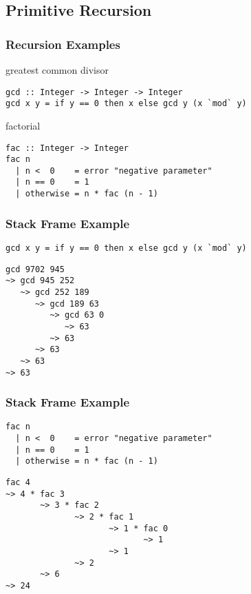 \documentclass[dvipsnames]{beamer}
\theoremstyle{plain}
\begin{document}
\subsection{Primitive Recursion}

\begin{frame}[fragile]
  \frametitle{Recursion Examples}

  \begin{exampleblock}{greatest common divisor}
    \begin{lstlisting}
gcd :: Integer -> Integer -> Integer
gcd x y = if y == 0 then x else gcd y (x `mod` y)
    \end{lstlisting}
  \end{exampleblock}

  \pause
  \begin{exampleblock}{factorial}
    \begin{lstlisting}
fac :: Integer -> Integer
fac n
  | n <  0    = error "negative parameter"
  | n == 0    = 1
  | otherwise = n * fac (n - 1)
    \end{lstlisting}
  \end{exampleblock}
\end{frame}

\begin{frame}[fragile]
  \frametitle{Stack Frame Example}

  \begin{exampleblock}{}
    \begin{lstlisting}
gcd x y = if y == 0 then x else gcd y (x `mod` y)
    \end{lstlisting}

    \begin{lstlisting}[frame=single]
gcd 9702 945
~> gcd 945 252
   ~> gcd 252 189
      ~> gcd 189 63
         ~> gcd 63 0
            ~> 63
         ~> 63
      ~> 63
   ~> 63
~> 63
    \end{lstlisting}
  \end{exampleblock}
\end{frame}

\begin{frame}[fragile]
  \frametitle{Stack Frame Example}

  \begin{exampleblock}{}
    \begin{lstlisting}
fac n
  | n <  0    = error "negative parameter"
  | n == 0    = 1
  | otherwise = n * fac (n - 1)
    \end{lstlisting}

    \begin{lstlisting}[frame=single]
fac 4
~> 4 * fac 3
       ~> 3 * fac 2
              ~> 2 * fac 1
                     ~> 1 * fac 0
                            ~> 1
                     ~> 1
              ~> 2
       ~> 6
~> 24
    \end{lstlisting}
  \end{exampleblock}
\end{frame}
\end{document}
